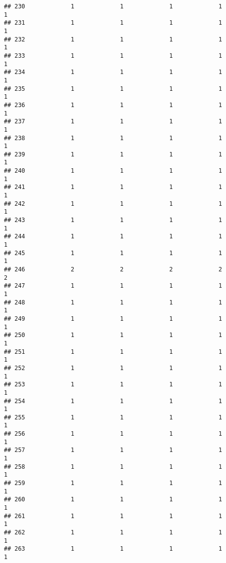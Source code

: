 \documentclass[
]{article}
\begin{document}
\begin{verbatim}
## 230             1             1             1             1             1
## 231             1             1             1             1             1
## 232             1             1             1             1             1
## 233             1             1             1             1             1
## 234             1             1             1             1             1
## 235             1             1             1             1             1
## 236             1             1             1             1             1
## 237             1             1             1             1             1
## 238             1             1             1             1             1
## 239             1             1             1             1             1
## 240             1             1             1             1             1
## 241             1             1             1             1             1
## 242             1             1             1             1             1
## 243             1             1             1             1             1
## 244             1             1             1             1             1
## 245             1             1             1             1             1
## 246             2             2             2             2             2
## 247             1             1             1             1             1
## 248             1             1             1             1             1
## 249             1             1             1             1             1
## 250             1             1             1             1             1
## 251             1             1             1             1             1
## 252             1             1             1             1             1
## 253             1             1             1             1             1
## 254             1             1             1             1             1
## 255             1             1             1             1             1
## 256             1             1             1             1             1
## 257             1             1             1             1             1
## 258             1             1             1             1             1
## 259             1             1             1             1             1
## 260             1             1             1             1             1
## 261             1             1             1             1             1
## 262             1             1             1             1             1
## 263             1             1             1             1             1

\end{verbatim}
\end{document}
